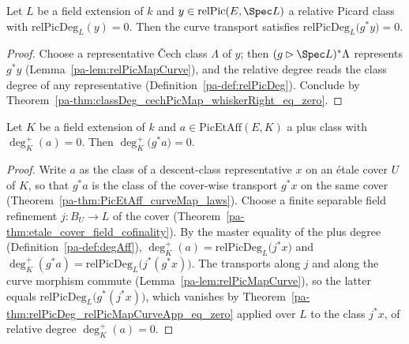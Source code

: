 \begin{theorem}
  \label{pa-thm:relPicDeg_relPicMapCurveApp_eq_zero}
  \leanok

  Let \(L\) be a field extension of \(k\) and \(y \in \mathrm{relPic}(E, \Spec L)\) a
  relative Picard class with \(\mathrm{relPicDeg}_L(y) = 0\). Then the curve transport
  satisfies \(\mathrm{relPicDeg}_L\bigl(g^{*}y\bigr) = 0\).
\end{theorem}
\begin{proof}
  \leanok
  Choose a representative \v Cech class \(\Lambda\) of \(y\); then
  \((g \rhd \Spec L)^{*}\Lambda\) represents \(g^{*}y\)
  (Lemma~\ref{pa-lem:relPicMapCurve}), and the relative degree reads the class degree of
  any representative (Definition~\ref{pa-def:relPicDeg}). Conclude by
  Theorem~\ref{pa-thm:classDeg_cechPicMap_whiskerRight_eq_zero}.
\end{proof}

\begin{theorem}
  \label{pa-thm:degAff_curveMap_eq_zero}
  \leanok

  Let \(K\) be a field extension of \(k\) and \(a \in \mathrm{PicEtAff}(E, K)\) a plus
  class with \(\deg^{+}_K(a) = 0\). Then \(\deg^{+}_K\bigl(g^{*}a\bigr) = 0\).
\end{theorem}
\begin{proof}
  \leanok
  Write \(a\) as the class of a descent-class representative \(x\) on an \'etale cover
  \(U\) of \(K\), so that \(g^{*}a\) is the class of the cover-wise transport
  \(g^{*}x\) on the same cover (Theorem~\ref{pa-thm:PicEtAff_curveMap_laws}). Choose a
  finite separable field refinement \(j \colon B_U \to L\) of the cover
  (Theorem~\ref{pa-thm:etale_cover_field_cofinality}). By the master equality of the plus
  degree (Definition~\ref{pa-def:degAff}),
  \(\deg^{+}_K(a) = \mathrm{relPicDeg}_L\bigl(j^{*}x\bigr)\) and
  \(\deg^{+}_K(g^{*}a) = \mathrm{relPicDeg}_L\bigl(j^{*}(g^{*}x)\bigr)\). The
  transports along \(j\) and along the curve morphism commute
  (Lemma~\ref{pa-lem:relPicMapCurve}), so the latter equals
  \(\mathrm{relPicDeg}_L\bigl(g^{*}(j^{*}x)\bigr)\), which vanishes by
  Theorem~\ref{pa-thm:relPicDeg_relPicMapCurveApp_eq_zero} applied over \(L\) to the class
  \(j^{*}x\), of relative degree \(\deg^{+}_K(a) = 0\).
\end{proof}

